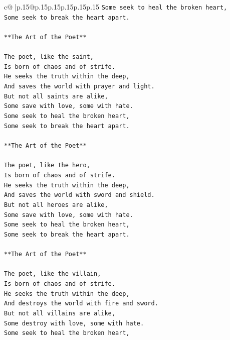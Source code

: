 \documentclass{article}
\begin{document}
{\begin{supertabular}{c@{$\;$}|p{.15\linewidth}@{}p{.15\linewidth}p{.15\linewidth}p{.15\linewidth}p{.15\linewidth}p{.15\linewidth}}
{{{\texttt{Some seek to heal the broken heart,} \\
\texttt{Some seek to break the heart apart.} \\
\\ 
\texttt{**The Art of the Poet**} \\
\\ 
\texttt{The poet, like the saint,} \\
\texttt{Is born of chaos and of strife.} \\
\texttt{He seeks the truth within the deep,} \\
\texttt{And saves the world with prayer and light.} \\
\texttt{But not all saints are alike,} \\
\texttt{Some save with love, some with hate.} \\
\texttt{Some seek to heal the broken heart,} \\
\texttt{Some seek to break the heart apart.} \\
\\ 
\texttt{**The Art of the Poet**} \\
\\ 
\texttt{The poet, like the hero,} \\
\texttt{Is born of chaos and of strife.} \\
\texttt{He seeks the truth within the deep,} \\
\texttt{And saves the world with sword and shield.} \\
\texttt{But not all heroes are alike,} \\
\texttt{Some save with love, some with hate.} \\
\texttt{Some seek to heal the broken heart,} \\
\texttt{Some seek to break the heart apart.} \\
\\ 
\texttt{**The Art of the Poet**} \\
\\ 
\texttt{The poet, like the villain,} \\
\texttt{Is born of chaos and of strife.} \\
\texttt{He seeks the truth within the deep,} \\
\texttt{And destroys the world with fire and sword.} \\
\texttt{But not all villains are alike,} \\
\texttt{Some destroy with love, some with hate.} \\
\texttt{Some seek to heal the broken heart,} \\
}}}
\end{supertabular}}
\end{document}
